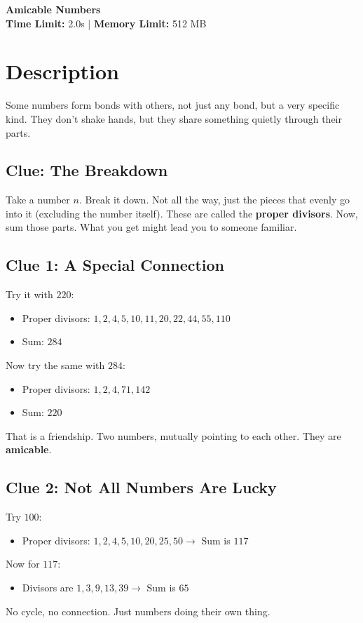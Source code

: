 \documentclass[12pt, a4paper]{article}
\begin{document}
\begin{center}
    {\huge \textbf{Amicable Numbers}} \\
    \vspace{0.2cm}
    \textbf{Time Limit:} 2.0s \quad | \quad \textbf{Memory Limit:} 512 MB
\end{center}

\vspace{0.5cm}

\section*{Description}
Some numbers form bonds with others, not just any bond, but a very specific kind. They don't shake hands, but they share something quietly through their parts.

\subsection*{Clue: The Breakdown}
Take a number $n$. Break it down. Not all the way, just the pieces that evenly go into it (excluding the number itself). These are called the \textbf{proper divisors}. Now, sum those parts. What you get might lead you to someone familiar.

\subsection*{Clue 1: A Special Connection}
Try it with $220$:
\begin{itemize}
    \item Proper divisors: $1, 2, 4, 5, 10, 11, 20, 22, 44, 55, 110$
    \item Sum: $284$
\end{itemize}

Now try the same with $284$:
\begin{itemize}
    \item Proper divisors: $1, 2, 4, 71, 142$
    \item Sum: $220$
\end{itemize}

That is a friendship. Two numbers, mutually pointing to each other. They are \textbf{amicable}.

\subsection*{Clue 2: Not All Numbers Are Lucky}
Try $100$:
\begin{itemize}
    \item Proper divisors: $1, 2, 4, 5, 10, 20, 25, 50 \rightarrow$ Sum is $117$
\end{itemize}
Now for $117$:
\begin{itemize}
    \item Divisors are $1, 3, 9, 13, 39 \rightarrow$ Sum is $65$
\end{itemize}
No cycle, no connection. Just numbers doing their own thing.
\end{document}
